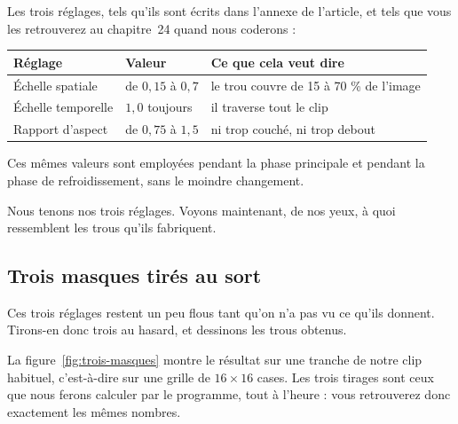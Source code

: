\begin{surlesdonnees}
Les trois réglages, tels qu'ils sont écrits dans l'annexe de l'article, et
tels que vous les retrouverez au chapitre~24 quand nous coderons :

\begin{center}
\footnotesize
\begin{tabular}{lll}
\toprule
\textbf{Réglage} & \textbf{Valeur} & \textbf{Ce que cela veut dire} \\
\midrule
Échelle spatiale  & de $0{,}15$ à $0{,}7$ &
  le trou couvre de 15 à 70 \% de l'image \\
Échelle temporelle & $1{,}0$ toujours &
  il traverse tout le clip \\
Rapport d'aspect  & de $0{,}75$ à $1{,}5$ &
  ni trop couché, ni trop debout \\
\bottomrule
\end{tabular}
\end{center}

Ces mêmes valeurs sont employées pendant la phase principale et pendant la
phase de refroidissement, sans le moindre changement.
\end{surlesdonnees}

Nous tenons nos trois réglages. Voyons maintenant, de nos yeux, à quoi
ressemblent les trous qu'ils fabriquent.

\subsection*{Trois masques tirés au sort}

Ces trois réglages restent un peu flous tant qu'on n'a pas vu ce qu'ils
donnent. Tirons-en donc trois au hasard, et dessinons les trous obtenus.

La figure~\ref{fig:trois-masques} montre le résultat sur une tranche de
notre clip habituel, c'est-à-dire sur une grille de $16 \times 16$ cases.
Les trois tirages sont ceux que nous ferons calculer par le programme, tout
à l'heure : vous retrouverez donc exactement les mêmes nombres.

